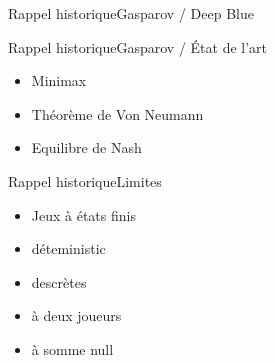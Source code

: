 \begin{frame}{Rappel historique}{Gasparov / Deep Blue}

\end{frame}

\begin{frame}{Rappel historique}{Gasparov / État de l'art}
\begin{itemize}
\item Minimax
\item Théorème de Von Neumann
\item Equilibre de Nash
\end{itemize}
\end{frame}

\begin{frame}{Rappel historique}{Limites}
\begin{itemize}
\item Jeux à états finis
\item déteministic
\item descrètes
\item à deux joueurs
\item à somme null
\end{itemize}
\end{frame}